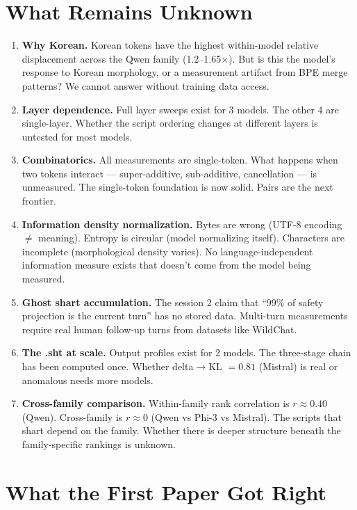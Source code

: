 \documentclass[11pt,a4paper]{article}
\begin{document}
\section{What Remains Unknown}

\begin{enumerate}[nosep]
\item \textbf{Why Korean.} Korean tokens have the highest within-model relative displacement across the Qwen family (1.2--1.65$\times$). But is this the model's response to Korean morphology, or a measurement artifact from BPE merge patterns? We cannot answer without training data access.
\item \textbf{Layer dependence.} Full layer sweeps exist for 3 models. The other 4 are single-layer. Whether the script ordering changes at different layers is untested for most models.
\item \textbf{Combinatorics.} All measurements are single-token. What happens when two tokens interact --- super-additive, sub-additive, cancellation --- is unmeasured. The single-token foundation is now solid. Pairs are the next frontier.
\item \textbf{Information density normalization.} Bytes are wrong (UTF-8 encoding $\neq$ meaning). Entropy is circular (model normalizing itself). Characters are incomplete (morphological density varies). No language-independent information measure exists that doesn't come from the model being measured.
\item \textbf{Ghost shart accumulation.} The session 2 claim that ``99\% of safety projection is the current turn'' has no stored data. Multi-turn measurements require real human follow-up turns from datasets like WildChat.
\item \textbf{The .sht at scale.} Output profiles exist for 2 models. The three-stage chain has been computed once. Whether delta$\to$KL $= 0.81$ (Mistral) is real or anomalous needs more models.
\item \textbf{Cross-family comparison.} Within-family rank correlation is $r \approx 0.40$ (Qwen). Cross-family is $r \approx 0$ (Qwen vs Phi-3 vs Mistral). The scripts that shart depend on the family. Whether there is deeper structure beneath the family-specific rankings is unknown.
\end{enumerate}

\section{What the First Paper Got Right}
\end{document}
